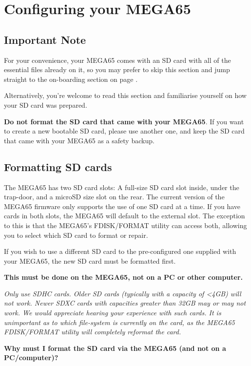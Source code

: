 \chapter{Configuring your MEGA65}
\label{cha:configuring}

\section{Important Note}

For your convenience, your MEGA65 comes with an SD card with all of the essential
files already on it, so you may prefer to skip this section and jump straight to
the on-boarding section on page \pageref{onboarding}.

Alternatively, you're welcome to read this section and familiarise
yourself on how your SD card was prepared.

{\bf Do not format the SD card that came with your MEGA65}.
If you want to create a new bootable SD card, please use another one,
and keep the SD card that came with your MEGA65 as a safety backup.

\section{Formatting SD cards}
The MEGA65 has two SD card slots: A full-size SD card slot inside, under
the trap-door, and a microSD size slot on the rear.  The current version
of the MEGA65 firmware only supports the use of one SD card at a time.
If you have cards in both slots, the MEGA65 will default to the external slot. The exception to this is that the MEGA65's FDISK/FORMAT
utility can access both, allowing you to select which SD card to format or
repair.

If you wish to use a different SD card to the pre-configured one supplied with your MEGA65, the new SD card must be formatted first.

{\bf This must be done on the MEGA65, not on a PC or other computer.}

{\em Only use SDHC cards. Older SD cards (typically with
  a capacity of <4GB) will not work. Newer SDXC cards with
  capacities greater than 32GB may or may not work. We would
  appreciate hearing your experience with such cards. It is unimportant
  as to which file-system is currently on the card, as the MEGA65
  FDISK/FORMAT utility will completely reformat the card.}

{\bf Why must I format the SD card via the MEGA65 (and not on a PC/computer)?}

